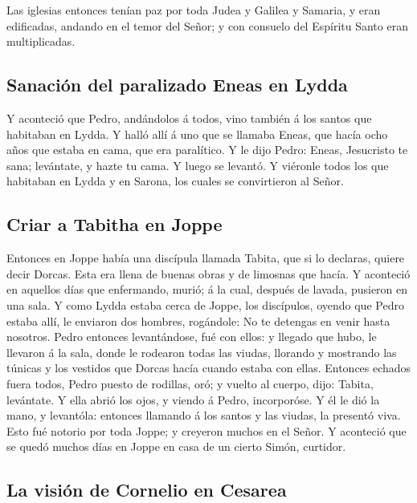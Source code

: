  Las iglesias entonces tenían paz por toda Judea y
Galilea y Samaria, y eran edificadas, andando en el temor del Señor; y
con consuelo del Espíritu Santo eran multiplicadas.

\hypertarget{sanaciuxf3n-del-paralizado-eneas-en-lydda}{%
\subsection{Sanación del paralizado Eneas en
Lydda}\label{sanaciuxf3n-del-paralizado-eneas-en-lydda}}

 Y aconteció que Pedro, andándolos á todos, vino también
á los santos que habitaban en Lydda.  Y halló allí á uno
que se llamaba Eneas, que hacía ocho años que estaba en cama, que era
paralítico.  Y le dijo Pedro: Eneas, Jesucristo te sana;
levántate, y hazte tu cama. Y luego se levantó.  Y
viéronle todos los que habitaban en Lydda y en Sarona, los cuales se
convirtieron al Señor.

\hypertarget{criar-a-tabitha-en-joppe}{%
\subsection{Criar a Tabitha en Joppe}\label{criar-a-tabitha-en-joppe}}

 Entonces en Joppe había una discípula llamada Tabita,
que si lo declaras, quiere decir Dorcas. Esta era llena de buenas obras
y de limosnas que hacía.  Y aconteció en aquellos días
que enfermando, murió; á la cual, después de lavada, pusieron en una
sala.  Y como Lydda estaba cerca de Joppe, los
discípulos, oyendo que Pedro estaba allí, le enviaron dos hombres,
rogándole: No te detengas en venir hasta nosotros.  Pedro
entonces levantándose, fué con ellos: y llegado que hubo, le llevaron á
la sala, donde le rodearon todas las viudas, llorando y mostrando las
túnicas y los vestidos que Dorcas hacía cuando estaba con ellas.
 Entonces echados fuera todos, Pedro puesto de rodillas,
oró; y vuelto al cuerpo, dijo: Tabita, levántate. Y ella abrió los ojos,
y viendo á Pedro, incorporóse.  Y él le dió la mano, y
levantóla: entonces llamando á los santos y las viudas, la presentó
viva.  Esto fué notorio por toda Joppe; y creyeron muchos
en el Señor.  Y aconteció que se quedó muchos días en
Joppe en casa de un cierto Simón, curtidor.

\hypertarget{la-visiuxf3n-de-cornelio-en-cesarea}{%
\subsection{La visión de Cornelio en
Cesarea}\label{la-visiuxf3n-de-cornelio-en-cesarea}}

